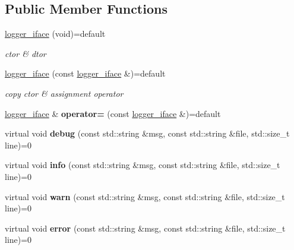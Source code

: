 \subsection*{Public Member Functions}
\begin{DoxyCompactItemize}
\item 
\mbox{\label{classnetflex_1_1logger__iface_a905b0aa24d0f482fb6bf92ebfcb1babb}} 
\hyperlink{classnetflex_1_1logger__iface_a905b0aa24d0f482fb6bf92ebfcb1babb}{logger\+\_\+iface} (void)=default
\begin{DoxyCompactList}\small\item\em ctor \& dtor \end{DoxyCompactList}\item 
\mbox{\label{classnetflex_1_1logger__iface_a761fb0e8a80fbb28a73a9e216230b64d}} 
\hyperlink{classnetflex_1_1logger__iface_a761fb0e8a80fbb28a73a9e216230b64d}{logger\+\_\+iface} (const \hyperlink{classnetflex_1_1logger__iface}{logger\+\_\+iface} \&)=default
\begin{DoxyCompactList}\small\item\em copy ctor \& assignment operator \end{DoxyCompactList}\item 
\mbox{\label{classnetflex_1_1logger__iface_a966026574277bb4910d83d13b872aa68}} 
\hyperlink{classnetflex_1_1logger__iface}{logger\+\_\+iface} \& {\bfseries operator=} (const \hyperlink{classnetflex_1_1logger__iface}{logger\+\_\+iface} \&)=default
\item 
\mbox{\label{classnetflex_1_1logger__iface_a0768fd1687f7d449b0cde0058038d52a}} 
virtual void {\bfseries debug} (const std\+::string \&msg, const std\+::string \&file, std\+::size\+\_\+t line)=0
\item 
\mbox{\label{classnetflex_1_1logger__iface_aac8e95dd5c24ac109e33c0002be110f0}} 
virtual void {\bfseries info} (const std\+::string \&msg, const std\+::string \&file, std\+::size\+\_\+t line)=0
\item 
\mbox{\label{classnetflex_1_1logger__iface_a0d1ee72c9b5ba9f08cb306d69ecc4822}} 
virtual void {\bfseries warn} (const std\+::string \&msg, const std\+::string \&file, std\+::size\+\_\+t line)=0
\item 
\mbox{\label{classnetflex_1_1logger__iface_a09e4dda02d64e420cf0d91cbef00fe1c}} 
virtual void {\bfseries error} (const std\+::string \&msg, const std\+::string \&file, std\+::size\+\_\+t line)=0
\end{DoxyCompactItemize}


